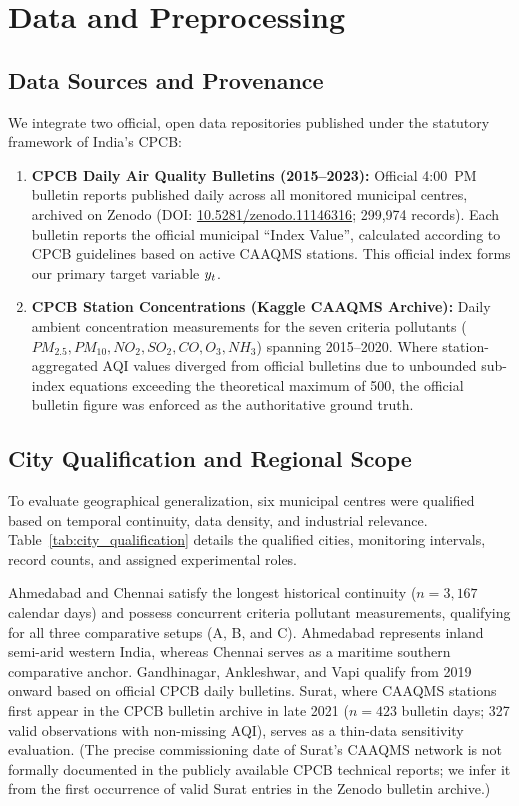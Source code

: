 \section{Data and Preprocessing}
\label{sec:data}

\subsection{Data Sources and Provenance}
We integrate two official, open data repositories published under the statutory framework of India's CPCB:
\begin{enumerate}
  \item \textbf{CPCB Daily Air Quality Bulletins (2015--2023):} Official 4:00~PM bulletin reports published daily across all monitored municipal centres, archived on Zenodo (DOI: \href{https://doi.org/10.5281/zenodo.11146316}{10.5281/zenodo.11146316}; 299,974 records). Each bulletin reports the official municipal ``Index Value'', calculated according to CPCB guidelines based on active CAAQMS stations. This official index forms our primary target variable $y_t$.
  \item \textbf{CPCB Station Concentrations (Kaggle CAAQMS Archive):} Daily ambient concentration measurements for the seven criteria pollutants ($PM_{2.5}, PM_{10}, NO_2, SO_2, CO, O_3, NH_3$) spanning 2015--2020. Where station-aggregated AQI values diverged from official bulletins due to unbounded sub-index equations exceeding the theoretical maximum of 500, the official bulletin figure was enforced as the authoritative ground truth.
\end{enumerate}

\subsection{City Qualification and Regional Scope}
To evaluate geographical generalization, six municipal centres were qualified based on temporal continuity, data density, and industrial relevance. Table~\ref{tab:city_qualification} details the qualified cities, monitoring intervals, record counts, and assigned experimental roles.



Ahmedabad and Chennai satisfy the longest historical continuity ($n = 3{,}167$ calendar days) and possess concurrent criteria pollutant measurements, qualifying for all three comparative setups (A, B, and C). Ahmedabad represents inland semi-arid western India, whereas Chennai serves as a maritime southern comparative anchor. Gandhinagar, Ankleshwar, and Vapi qualify from 2019 onward based on official CPCB daily bulletins. Surat, where CAAQMS stations first appear in the CPCB bulletin archive in late 2021 ($n = 423$ bulletin days; 327 valid observations with non-missing AQI), serves as a thin-data sensitivity evaluation. (The precise commissioning date of Surat's CAAQMS network is not formally documented in the publicly available CPCB technical reports; we infer it from the first occurrence of valid Surat entries in the Zenodo bulletin archive.)

